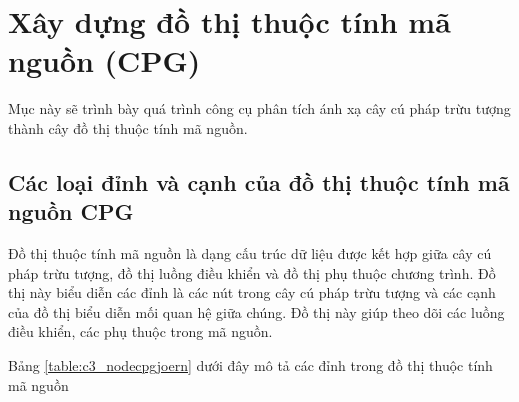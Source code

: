 \section{Xây dựng đồ thị thuộc tính mã nguồn (CPG)}

Mục này sẽ trình bày quá trình công cụ phân tích ánh xạ cây cú pháp trừu tượng
thành cây đồ thị thuộc tính mã nguồn.

\subsection{Các loại đỉnh và cạnh của đồ thị thuộc tính mã nguồn CPG}

Đồ thị thuộc tính mã nguồn là dạng cấu trúc dữ liệu được kết hợp giữa cây cú pháp trừu tượng, đồ thị luồng điều khiển và đồ thị phụ thuộc chương trình.
Đồ thị này biểu diễn các đỉnh là các nút trong cây cú pháp trừu tượng và các cạnh của đồ thị biểu diễn mối quan hệ giữa chúng.
Đồ thị này giúp theo dõi các luồng điều khiển, các phụ thuộc trong mã nguồn.

Bảng \ref{table:c3_nodecpgjoern} dưới đây mô tả các đỉnh trong đồ thị thuộc tính mã nguồn

